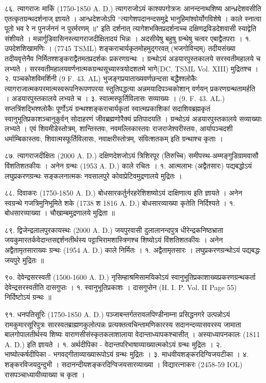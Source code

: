 ८६. त्यागराजः माकिं (1750-1850 A. D.)
त्यागराजोऽयं काश्यपगोत्रजः आनन्दनाथशिष्य आन्ध्रदेशवसीति एतत्कृतग्रन्थदर्शनाज् ज्ञायते । आन्ध्रदेशजोऽपि 
``त्यागेशपदानन्दसमुद्रे भानुहिमांश्वोर्योगविशेषे ।
काले स्नात्वा पूतो भव रे न पुनर्जननं न पुरर्मरणम् ॥"
इति दर्शनात् त्यागेशभक्तिप्रदर्शनाच्च दक्षिणद्रविडदेशवासी स्याद्वेति संशीयते ।
मन्नार्गुडिवासिनस्त्यागराजदीक्षितादयं भिन्नः । अदसीयेषु बहुषु ग्रन्थेषु चत्वर एबाद्वैतपराः ।
१. उपदेशशिखामणिः । (7745 TSML)
शङ्कराचार्यकृतमोहमुद्गरवत् (भजगोविन्दम्) तदीयसंख्या तदीयवृत्तेनैव निर्मितश्शङ्कराद्वैतमतप्रदर्शकः प्रकरणग्रन्थः । ग्रन्थोऽयं अडयारपुस्तकालये सरस्वतीमहालये च लभ्यते । सरस्वतीमहालयवर्णनात्मकग्रन्थसूच्यास्त्रयोदशतमे भागे(DC. TSML Vol. XIII) मुद्रितश्च ।
२. पञ्चकोशविमर्शिनी (9 F. 43. AL)
भुजङ्गप्रयाताख्यवर्णछन्दसा बद्धैश्श्लोकैः त्यागराजात्मकपरमात्मस्वरूपनिरूपणपरया स्तुतिपद्धत्या अन्नमयादिपञ्चकोशान् वर्णयन् प्रकरणग्रन्थतामर्हति । अडयारपुस्तकालये लभ्यते च ।
३. स्वात्मस्फूर्तिविलासः सव्याख्यः । (9. F. 43. AL.)
सप्तत्रिंशद्भिश्श्लोकैः पूर्णोऽयं ग्रन्थश्शङ्कराचार्यकृतां स्वात्मप्रकाशिकां सदाशिवब्रह्मकृतं स्वानुभूतिप्रकाशञ्चानुकुर्वन् सोदाहरणं जीवब्रह्मणोरैक्यं प्रतिपादयति । ग्रन्थोऽयं अडयारपुस्तकालये सव्याख्याः लभ्यते ।
एवं शिवमीडेस्तोत्रम्, शान्तिस्तवः, नवमल्लिकास्तवः राजराजेश्वरीस्तवः, आर्यापञ्चदशी धर्माम्बिकास्तवः, शिवात्मस्फूर्तिविलासः, नवाक्षरीस्तोत्रम्, संवित्शतकम् इति ग्रन्थाश्च कृताः ।

८७. त्यागराजदीक्षितः (2000 A. D.)
दक्षिणदेशजोऽयं त्रिशिरपूर (तिरुच्चि) समीपस्थ-अम्मङ्गुडिग्रामवासौ विंशतिशतकीयः । अनेन ग्रन्थः (1953 A. D.) काले रचितः ।
१. आत्मलाभः (अद्वैतसारः) पद्यबद्धोऽयं लघुप्रकरणग्रन्थः सङ्कलनात्मकः नवसालपुरे कोवाप्रेटिवमुद्रणालये मुद्रितः ।

८८. दिवाकरः (1750-1850 A. D.)
बोधसारकर्तुर्नरहरेशिशष्योऽयं दाक्षिणात्य इति ज्ञायते । अनेन स्वग्रन्थे गजत्रिमुनिभूमिते शके (1738 श 1816 A. D.) बोधसारव्याख्या कृतेति निर्दिश्यते ।
१. बोधसारव्याख्या । चौखाम्बमुद्रणालये मुद्रिता ॥

८९. द्विजेन्द्रलालपुरकायस्थः (2000 A. D.)
जयपुरवासी दुलालानन्दपुत्र धीरेन्द्रकनिष्ठभ्राता जयकुमारतर्कवेदान्तसद्दर्शनतीर्थस्य पट्टाभिरामशास्त्रिणश्च शिष्योऽयं विंशतिशतकीयः । अनेन अद्वैतामृतसाराख्यः ग्रन्थः (1954 A. D.) काले निर्मितः ।
१. अद्वैतामृतसारः । लघुप्रकरणग्रन्थोऽयं पद्यबद्धः जयपुरे मुद्रितः ॥

९०. देवेन्द्रसरस्वती (1500-1600 A. D.)
नृसिम्हाश्रमिसामयिकोऽयं स्वानुभूतिप्रकाशाख्यप्रकरणग्रन्थकर्ता देवेन्द्रसरस्वतीति दासगुप्तः ।
१. स्वानुभूतिप्रकाशः । दासगुप्तेन (H. I. P. Vol. II Page 55) निर्दिष्टोऽयं ग्रन्थः ॥

९१. धनपतिसूरिः (1750-1850 A. D.)
पञ्जाबन्तर्गतरावलपिण्डीनाम्ना प्रसिद्धनगरे उत्पन्नोऽयं रामकुमारसूरिपुत्रः सारस्वतब्राह्मणकुलोत्पन्नः प्रत्यक्तत्वचिन्तामणिकारस्य सदानन्दव्यासवरस्य जामाता बालगोपालतीर्थस्य शिष्यः वाराणसीसंस्कृतकलाशालाया वेदान्ताध्यापकश्चासीत् । अस्याध्यापनकालः (1811 A. D.) इति ज्ञायते ।
१. अर्थदीपिका - वेदान्तपरिभाषाव्याख्यात्मकोऽयं ग्रन्थः मुद्रितः ।
२. भाष्योत्कर्षदीपिका - भगवद्गीताव्याख्यारूपोऽयं ग्रन्थः मुद्रितः ।
३. माधवीयशङ्करदिग्विजयटीका ।
४. शङ्करविजयदुन्दुभी । सदानन्दीयशङ्करदिग्विजयसारव्याख्या । विद्यारत्नाकरः (2458-59 IOL) रासपञ्चाध्यायीव्याख्या च कृता ।

